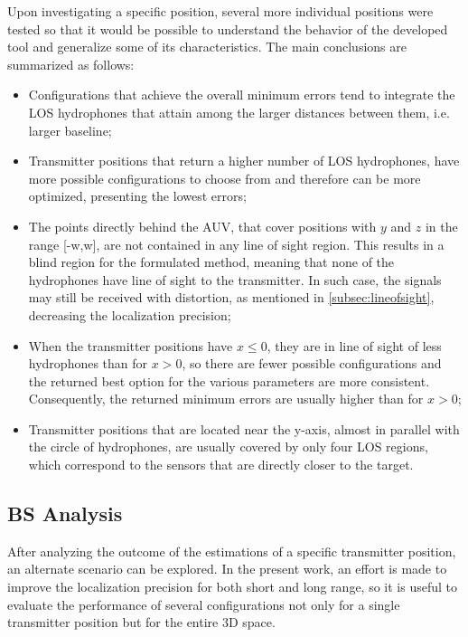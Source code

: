 Upon investigating a specific position, several more individual positions were tested so that it would be possible to understand the behavior of the developed tool and generalize some of its characteristics. The main conclusions are summarized as follows:
\begin{itemize}
	\item Configurations that achieve the overall minimum errors tend to integrate the LOS hydrophones that attain among the larger distances between them, i.e. larger baseline;
	
	\item Transmitter positions that return a higher number of LOS hydrophones, have more possible configurations to choose from and therefore can be more optimized, presenting the lowest errors;
	
	\item The points directly behind the AUV, that cover positions with $y$ and $z$ in the range [-w,w], are not contained in any line of sight region. This results in a blind region for the formulated method, meaning that none of the hydrophones have line of sight to the transmitter. In such case, the signals may still be received with distortion, as mentioned in \ref{subsec:lineofsight}, decreasing the localization precision;
	
	\item When the transmitter positions have $x \leq 0$, they are in line of sight of less hydrophones than for $x > 0$, so there are fewer possible configurations and the returned best option for the various parameters are more consistent. Consequently, the returned minimum errors are usually higher than for $x > 0$;
	
	\item Transmitter positions that are located near the y-axis, almost in parallel with the circle of hydrophones, are usually covered by only four LOS regions, which correspond to the sensors that are directly closer to the target.
\end{itemize}

\subsection{BS Analysis} \label{subsec:bs-2}

After analyzing the outcome of the estimations of a specific transmitter position, an alternate scenario can be explored. In the present work, an effort is made to improve the localization precision for both short and long range, so it is useful to evaluate the performance of several configurations  not only for a single transmitter position but for the entire 3D space. 

